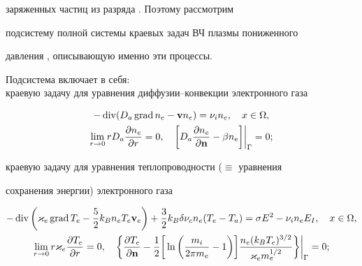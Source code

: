 заряженных частиц из разряда \cite{k_295}. Поэтому рассмотрим


подсистему полной системы краевых задач ВЧ плазмы пониженного


давления \cite{my_book}, описывающую именно эти процессы.


Подсистема включает в себя: \\





краевую задачу для уравнения диффузии--конвекции электронного газа


\begin{gather}


-\Div (D_a \grad n_e - \bold{v} n_{e})=


\nu_i n_{e} , \quad x \in \Omega, \label{E:k_3_72} \\


%


\lim_{r \to 0} rD_a \frac{\partial n_e}{\partial r}=0, \quad


\bigg[D_a \frac{\partial n_e}{\partial \bold{n}} - \beta n_e\bigg]


\bigg|_\Gamma=0; \label{E:k_3_73}


\end{gather}


краевую задачу для уравнения теплопроводности ($\equiv$ уравнения


сохранения энергии) электронного газа


\begin{gather}


-\Div \bigg(\varkappa_{e}\grad T_{e} -


\frac{5}{2} k_B n_{e}T_{e}\bold{v}_{e}\bigg)


+\frac{3}{2} k_B\delta \nu_{c}n_{e}(T_{e} -T_a)=\sigma E^{2} -


\nu_{i}n_{e}E_{I},\quad x \in \Omega, \label{E:k_3_74}\\


%


\lim_{r \to 0} r\varkappa_{e} \frac{\partial T_e}{\partial r}=0, \quad


\bigg\{\frac{\partial T_{e}}{\partial \bold n} - \frac{1}{2}


\bigg[\ln\bigg(\frac{m_{i}}{2 \pi m_{e}} - 1 \bigg)\bigg]


\frac{n_{e}(k_B T_{e})^{3/2}}{\varkappa_{e}m_e^{1/2}}\bigg\}


\bigg|_{\Gamma}=0; \label{E:k_3_75}


\end{gather}


